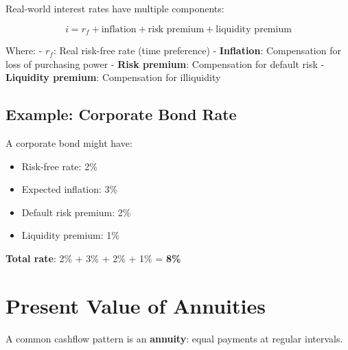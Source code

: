 \documentclass[
  letterpaper,
]{scrbook}
\providecommand{\tightlist}{%
  \setlength{\itemsep}{0pt}\setlength{\parskip}{0pt}}
\begin{document}
Real-world interest rates have multiple components:

\begin{tcolorbox}[enhanced jigsaw, toptitle=1mm, colbacktitle=quarto-callout-important-color!10!white, opacityback=0, leftrule=.75mm, breakable, colframe=quarto-callout-important-color-frame, toprule=.15mm, opacitybacktitle=0.6, coltitle=black, bottomrule=.15mm, colback=white, arc=.35mm, titlerule=0mm, rightrule=.15mm, left=2mm, title=\textcolor{quarto-callout-important-color}{\faExclamation}\hspace{0.5em}{Interest Rate Components}, bottomtitle=1mm]

\[
i = r_f + \text{inflation} + \text{risk premium} + \text{liquidity premium}
\]

Where: - \textbf{\(r_f\)}: Real risk-free rate (time preference) -
\textbf{Inflation}: Compensation for loss of purchasing power -
\textbf{Risk premium}: Compensation for default risk - \textbf{Liquidity
premium}: Compensation for illiquidity

\end{tcolorbox}

\subsection{Example: Corporate Bond
Rate}\label{example-corporate-bond-rate}

A corporate bond might have:

\begin{itemize}
\tightlist
\item
  Risk-free rate: 2\%
\item
  Expected inflation: 3\%
\item
  Default risk premium: 2\%
\item
  Liquidity premium: 1\%
\end{itemize}

\textbf{Total rate}: 2\% + 3\% + 2\% + 1\% = \textbf{8\%}

\section{Present Value of Annuities}\label{present-value-of-annuities}

A common cashflow pattern is an \textbf{annuity}: equal payments at
regular intervals.
\end{document}
